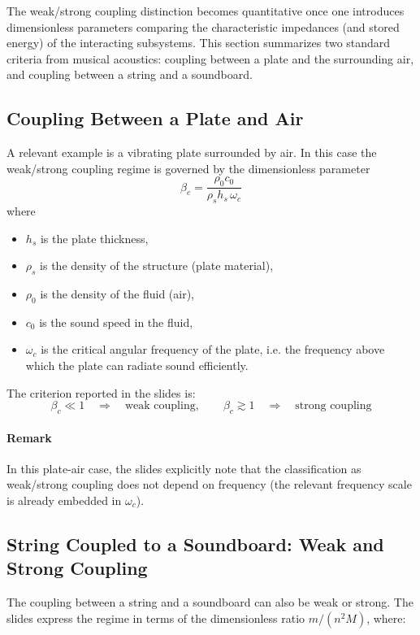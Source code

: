 The weak/strong coupling distinction becomes quantitative once one introduces dimensionless parameters comparing the characteristic impedances (and stored energy) of the interacting subsystems. This section summarizes two standard criteria from musical acoustics: coupling between a plate and the surrounding air, and coupling between a string and a soundboard.

\subsection{Coupling Between a Plate and Air}

A relevant example is a vibrating plate surrounded by air. In this case the weak/strong coupling regime is governed by the dimensionless parameter 
\[
\beta_c = \frac{\rho_0 c_0}{\rho_s h_s\,\omega_c}
\]
where

\begin{itemize}
    \item \( h_s \) is the plate thickness,
    \item \( \rho_s \) is the density of the structure (plate material),
    \item \( \rho_0 \) is the density of the fluid (air),
    \item \( c_0 \) is the sound speed in the fluid,
    \item \( \omega_c \) is the critical angular frequency of the plate, i.e. the frequency above which the plate can radiate sound efficiently.
\end{itemize}

The criterion reported in the slides is: 
\[
\beta_c  \ll 1 \quad \Rightarrow \quad \text{weak coupling},
\qquad
\beta_c \gtrsim 1 \quad \Rightarrow \quad \text{strong coupling}
\]
\paragraph{Remark} In this plate-air case, the slides explicitly note that the classification as weak/strong coupling does not depend on frequency (the relevant frequency scale is already embedded in \( \omega_c \)). 

\subsection{String Coupled to a Soundboard: Weak and Strong Coupling}

The coupling between a string and a soundboard can also be weak or strong. The slides express the regime in terms of the dimensionless ratio \( m/(n^2M) \), where:

